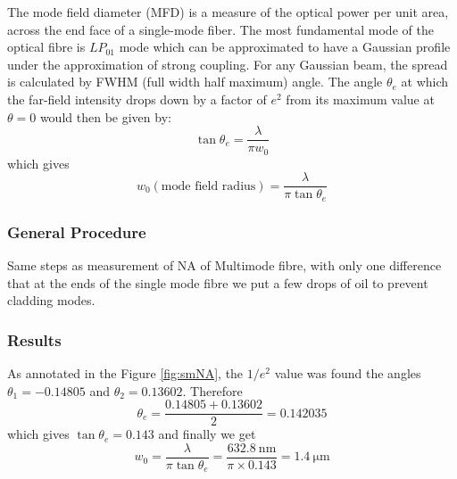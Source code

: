 \documentclass[%
 reprint,
nofootinbib,
 amsmath,amssymb,
 aps,
]{revtex4-2}
\begin{document}
The mode field diameter (MFD) is a measure of the optical power per unit area, across the end face of a single-mode
fiber. The most fundamental mode of the optical fibre is
$ LP_{01} $ mode which can be approximated to have a Gaussian
profile under the approximation of strong coupling. For any
Gaussian beam, the spread is calculated by FWHM (full width half maximum) angle.
The angle $ \theta_e $ at which the far-field intensity drops down by
a factor of $ e^2 $ from its maximum value at $ \theta = 0 $ would then
be given by:
\begin{equation}\label{key}
	\tan \theta_e = \dfrac{\lambda}{\pi w_0}
\end{equation}
which gives
\begin{equation}\label{key}
	w_0 (\textrm{mode field radius}) = \dfrac{\lambda}{\pi \tan \theta_e}
\end{equation}
\subsubsection*{\textbf{General Procedure}}
Same steps as measurement of NA of Multimode fibre,
with only one difference that at the ends of the single mode
fibre we put a few drops of oil to prevent cladding modes.
\subsubsection*{\textbf{Results}}
As annotated in the Figure \ref{fig:smNA}, the $ 1/e^2 $ value was found the angles $ \theta_1 = -0.14805 $ and $ \theta_2 = 0.13602 $. Therefore
\begin{equation}\label{key}
	\theta_e = \dfrac{0.14805+0.13602}{2} = 0.142035
\end{equation}
which gives $ \tan \theta_e = 0.143 $ and finally we get
\begin{equation}\label{key}
	w_0 = \dfrac{\lambda}{\pi \tan \theta_e} = \dfrac{\SI{632.8}{\nano \meter}}{\pi \times 0.143} = \SI{1.4}{\micro \meter}
\end{equation}
\end{document}
